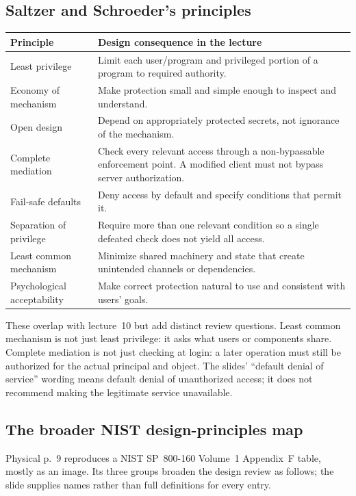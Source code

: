 \documentclass[11pt,a4paper]{article}
\numberwithin{figure}{section}
\begin{document}
\subsection{Saltzer and Schroeder's principles}
\par\noindent\begin{tabularx}{\linewidth}{@{}>{\raggedright\arraybackslash}p{38mm}Y@{}}\toprule
Principle & Design consequence in the lecture\\\midrule
Least privilege & Limit each user/program and privileged portion of a program to required authority.\\
Economy of mechanism & Make protection small and simple enough to inspect and understand.\\
Open design & Depend on appropriately protected secrets, not ignorance of the mechanism.\\
Complete mediation & Check every relevant access through a non-bypassable enforcement point. A modified client must not bypass server authorization.\\
Fail-safe defaults & Deny access by default and specify conditions that permit it.\\
Separation of privilege & Require more than one relevant condition so a single defeated check does not yield all access.\\
Least common mechanism & Minimize shared machinery and state that create unintended channels or dependencies.\\
Psychological acceptability & Make correct protection natural to use and consistent with users' goals.\\\bottomrule
\end{tabularx}\par

These overlap with lecture~10 but add distinct review questions. Least common mechanism is not just least privilege: it asks what users or components share. Complete mediation is not just checking at login: a later operation must still be authorized for the actual principal and object. The slides' ``default denial of service'' wording means default denial of unauthorized access; it does not recommend making the legitimate service unavailable.

\subsection{The broader NIST design-principles map}
Physical p.~9 reproduces a NIST SP~800-160 Volume~1 Appendix~F table, mostly as an image. Its three groups broaden the design review as follows; the slide supplies names rather than full definitions for every entry.
\end{document}
